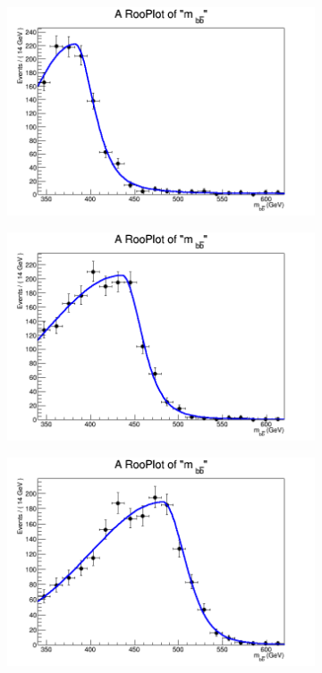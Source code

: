 \begin{figure}[phtb!]
  \begin{center}
  \begin{subfigure}[$m_{A}=400$ GeV]{0.4\textwidth}\includegraphics[width=\textwidth]{FitResults/images/fitMC_bAbb400_4.png}\end{subfigure}
  \begin{subfigure}[$m_{A}=450$ GeV]{0.4\textwidth}\includegraphics[width=\textwidth]{FitResults/images/fitMC_bAbb450_4.png}\end{subfigure}
  \begin{subfigure}[$m_{A}=500$ GeV]{0.4\textwidth}\includegraphics[width=\textwidth]{FitResults/images/fitMC_bAbb500_4.png}\end{subfigure}

\end{center}
\end{figure}
